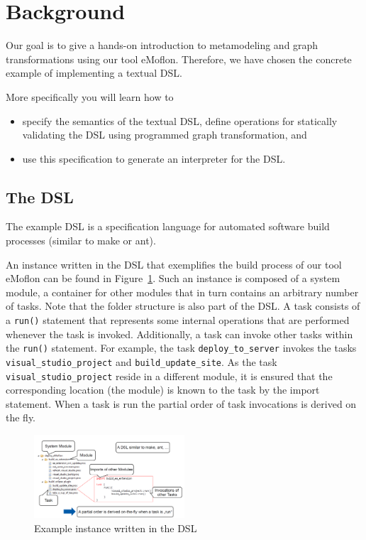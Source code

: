 
\section{Background}
 
Our goal is to give a hands-on introduction to metamodeling and graph transformations using our tool eMoflon. 
Therefore, we have chosen the concrete example of implementing a textual DSL. 

More specifically you will learn how to
\begin{itemize}
  \item specify the semantics of the textual DSL, define operations for statically validating the DSL using programmed graph transformation, and
  \item use this specification to generate an interpreter for the DSL.
\end{itemize} 

 
\subsection{The DSL}
The example DSL is a specification language for automated software build processes (similar to make or ant).

An instance written in the DSL that exemplifies the build process of our tool eMoflon can be found in Figure~\ref{fig: Example instance written in the DSL}. 
Such an instance is composed of a system module, a container for other modules that in turn contains an arbitrary number of tasks. 
Note that the folder structure is also part of the DSL. A task consists of a \texttt{run()} statement that represents some internal operations that are performed whenever the task is invoked. 
Additionally, a task can invoke other tasks within the \texttt{run()} statement. For example, the task \texttt{deploy\_to\_server} invokes the tasks \texttt{visual\_studio\_project} and \texttt{build\_update\_site}. 
As the task \texttt{visual\_studio\_project} reside in a different module, it is ensured that the corresponding location (the module) is known to the task by the import statement. 
When a task is run the partial order of task invocations is derived on the fly.
\begin{figure}[h]
\begin{center} 
\includegraphics[width=0.5\textwidth]{figures/DSL.png} 
\end{center}
\caption{Example instance written in the DSL}
\label{fig: Example instance written in the DSL}
\end{figure}  

